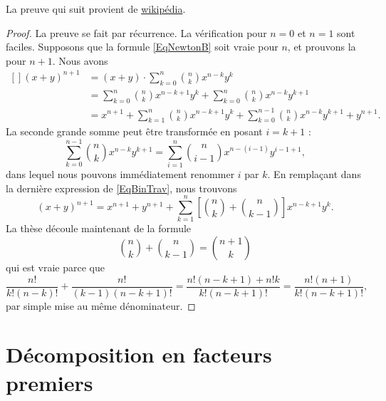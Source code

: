 La preuve qui suit provient de \href{http://fr.wikipedia.org/wiki/Formule_du_binôme_de_Newton}{wikipédia}.
\begin{proof}
La preuve se fait par récurrence. La vérification pour $n=0$ et $n=1$ sont faciles. Supposons que la formule \eqref{EqNewtonB} soit vraie pour $n$, et prouvons la pour $n+1$. Nous avons
\begin{equation}        \label{EqBinTrav}
    \begin{aligned}[]
        (x+y)^{n+1} &=(x+y)\cdot  \sum_{k=0}^n{n\choose k}x^{n-k}y^k\\
                &= \sum_{k=0}^n{n\choose k}x^{n-k+1}y^k+\sum_{k=0}^n{n\choose k}x^{n-k}y^{k+1}\\
                &=x^{n+1}+ \sum_{k=1}^n{n\choose k}x^{n-k+1}y^k+\sum_{k=0}^{n-1}{n\choose k}x^{n-k}y^{k+1}+y^{n+1}.
    \end{aligned}
\end{equation}
La seconde grande somme peut être transformée en posant $i=k+1$ :
\begin{equation}
    \sum_{k=0}^{n-1}{n\choose k}x^{n-k}y^{k+1}  =\sum_{i=1}^n{n\choose i-1}x^{n-(i-1)}y^{i-1+1},
\end{equation}
dans lequel nous pouvons immédiatement renommer $i$ par $k$. En remplaçant dans la dernière expression de \eqref{EqBinTrav}, nous trouvons
\begin{equation}
    (x+y)^{n+1}=x^{n+1}+y^{n+1}+\sum_{k=1}^n\left[ {n\choose k}+{n\choose k-1} \right]x^{n-k+1}y^k.
\end{equation}
La thèse découle maintenant de la formule
\begin{equation}
    {n\choose k}+{n\choose k-1}={n+1\choose k}
\end{equation}
qui est vraie parce que
\begin{equation}
    \frac{ n! }{ k!(n-k)! }+\frac{ n! }{ (k-1)(n-k+1)! }=\frac{ n!(n-k+1)+n!k }{ k!(n-k+1)! }=\frac{ n!(n+1) }{  k!(n-k+1)!  },
\end{equation}
par simple mise au même dénominateur.
\end{proof}

\section{Décomposition en facteurs premiers}

